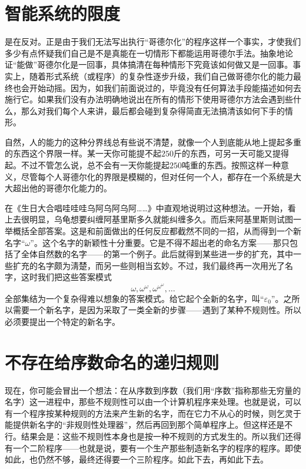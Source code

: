 \section{智能系统的限度}

是在反对。正是由于我们无法写出执行“哥德尔化”的程序这样一个事实，才使我们多少有点怀疑我们自己是不是真能在一切情形下都能运用哥德尔手法。抽象地论证“能做”哥德尔化是一回事，具体搞清在每种情形下究竟该如何做又是一回事。事实上，随着形式系统（或程序）的复杂性逐步升级，我们自己做哥德尔化的能力最终也会开始动摇。因为，如我们前面说过的，毕竟没有任何算法手段能描述如何去施行它。如果我们没有办法明确地说出在所有的情形下使用哥德尔方法会遇到些什么，那么对我们每个人来讲，最后都会碰到复杂得简直无法搞清该如何下手的情形。

自然，人的能力的这种分界线总有些说不清楚，就像一个人到底能从地上提起多重的东西这个界限一样。某一天你可能提不起$250$斤的东西，可另一天可能又提得起。不过不管怎么说，总不会有一天你能提起$250$吨重的东西。按照这样一种意义，尽管每个人哥德尔化的界限是模糊的，但对任何一个人，都存在一个系统是大大超出他的哥德尔化能力的。

在《生日大合唱哇哇哇乌阿乌阿乌阿……》中直观地说明过这种想法。一开始，看上去很明显，乌龟想要纠缠阿基里斯多久就能纠缠多久。而后来阿基里斯则试图一举概括全部答案。这是和前面做出的任何反应都截然不同的一招，从而得到一个新名字“$\omega$”。这个名字的新颖性十分重要。它是不得不超出老的命名方案——那只包括了全体自然数的名字——的第一个例子。此后就得到某些进一步的扩充，其中一些扩充的名字颇为淸楚，而另一些则相当玄妙。不过，我们最终再一次用光了名字，这时我们把这些答案模式
\[
\omega, \omega^\omega, \omega^{\omega^\omega},\dotsc
\]
全部集结为一个复杂得难以想象的答案模式。给它起个全新的名字，叫“$\varepsilon_0$”。之所以需要一个新名字，是因为采取了一类全新的步骤——遇到了某种不规则性。所以必须要提出一个特定的新名字。

\section{不存在给序数命名的递归规则}

现在，你可能会冒出一个想法：在从序数到序数（我们用“序数”指称那些无穷量的名字）这一进程中，那些不规则性可以由一个计算机程序来处理。也就是说，可以有一个程序按某种规则的方法来产生新的名字，而在它力不从心的时候，则乞灵于能提供新名字的“非规则性处理器”，然后再回到那个简单程序上。但这样还是不行。结果会是：这些不规则性本身也是按一种不规则的方式发生的。所以我们还得有一个二阶程序——也就是说，要有一个生产那些制造新名字的程序的程序。即使如此，也仍然不够，最终还得要一个三阶程序。如此下去，再如此下去。

